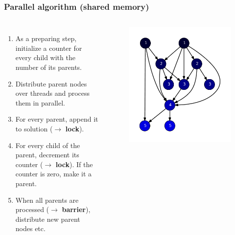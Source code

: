 \begin{frame}
\frametitle{Parallel algorithm (shared memory)}
\begin{columns}[c]
  \begin{enumerate}
    \item As a preparing step, initialize a counter for every child with the number of its parents.
    \item Distribute parent nodes over threads and process them in parallel.
    \item For every parent, append it to solution ($\rightarrow$ \textbf{lock}).
    \item For every child of the parent, decrement its counter ($\rightarrow$ \textbf{lock}). If the counter is zero, make it a parent.
    \item When all parents are processed ($\rightarrow$ \textbf{barrier}), distribute new parent nodes etc.
  \end{enumerate}

  \begin{figure}[!ht]
    \begin{center}
      \includegraphics[width=\textwidth]{img/software10.pdf}
    \end{center}
  \end{figure}
\end{columns}

\end{frame}


